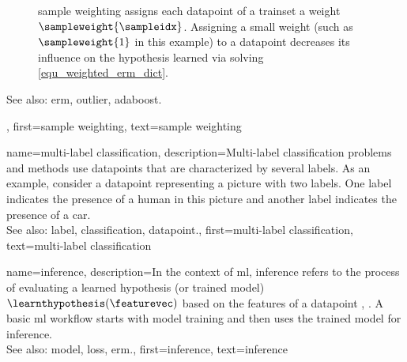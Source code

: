 {{\begin{figure}[H]
\begin{center}
      		\caption{\Gls{sample} weighting assigns each \gls{datapoint} of a \gls{trainset} 
	  		a weight $\sampleweight{\sampleidx}$. Assigning a small weight 
	  		(such as $\sampleweight{1}$ in this example) to a 
	  		\gls{datapoint} decreases its influence on the \gls{hypothesis} 
	 		learned via solving \eqref{equ_weighted_erm_dict}.}
      			\label{fig_sampleweighting_dict}
    			\end{center}
    		\end{figure}
		See also: \gls{erm}, \gls{outlier}, \gls{adaboost}.},
	first={sample weighting}, 
	text={sample weighting}
}

{name={multi-label classification}, 
	description={Multi-\gls{label} 
		\gls{classification} problems and methods use \glspl{datapoint} 
		that are characterized by several \glspl{label}. As an example, consider a \gls{datapoint} 
		representing a picture with two \glspl{label}. One \gls{label} indicates the presence of a human 
		in this picture and another \gls{label} indicates the presence of a car.
				\\
		See also: \gls{label}, \gls{classification}, \gls{datapoint}.},
	    first={multi-label classification},
	    text={multi-label classification} 
}

{name={inference}, 
	description={In the context of \gls{ml}, inference refers to the process 
		of evaluating a learned \gls{hypothesis} (or trained \gls{model}) $\learnthypothesis(\featurevec)$ 
		based on the \glspl{feature} of a \gls{datapoint} \cite{BishopBook}, \cite{Murphy2012}. 
		A basic \gls{ml} workflow starts with \gls{model} \gls{training} and then 
		uses the trained \gls{model} for inference. 
				\\
		See also: \gls{model}, \gls{loss}, \gls{erm}.},
	first={inference},
	text={inference}
}

